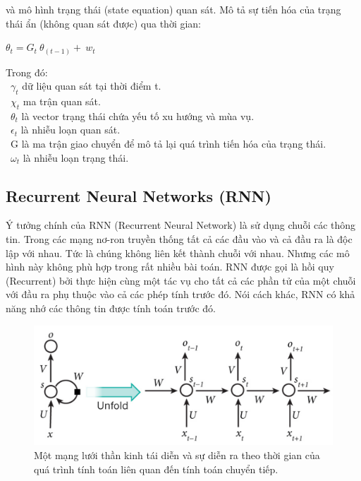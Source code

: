 \documentclass[conference]{IEEEtran}
\begin{document}
và mô hình trạng thái (state equation) quan sát. Mô tả sự tiến hóa của trạng thái ẩn (không quan sát được) qua thời gian:

\begin{center}

    \(\theta_t=G_t\ \theta_(t-1)+\ w_t\)

\end{center}

Trong đó:\\
\indent\textbullet\ \(\gamma_t\) dữ liệu quan sát tại thời điểm t.\\
\indent\textbullet\ \(\chi_t\) ma trận quan sát.\\
\indent\textbullet\ \(\theta_t\) là vector trạng thái chứa yếu tố xu hướng và mùa vụ.\\
\indent\textbullet\ \(\epsilon_t\) là nhiễu loạn quan sát.\\
\indent\textbullet\ G là ma trận giao chuyển để mô tả lại quá trình tiến hóa của trạng thái.\\
\indent\textbullet\ \(\omega_t\) là nhiễu loạn trạng thái.

\subsection{Recurrent Neural Networks (RNN)}
Ý tưởng chính của RNN (Recurrent Neural Network) là sử dụng chuỗi các thông tin. Trong các mạng nơ-ron truyền thống tất cả các đầu vào và cả đầu ra là độc lập với nhau. Tức là chúng không liên kết thành chuỗi với nhau. Nhưng các mô hình này không phù hợp trong rất nhiều bài toán. RNN được gọi là hồi quy (Recurrent) bởi thực hiện cùng một tác vụ cho tất cả các phần tử của một chuỗi với đầu ra phụ thuộc vào cả các phép tính trước đó. Nói cách khác, RNN có khả năng nhớ các thông tin được tính toán trước đó.

\begin{figure}[H]
    \centering
    \begin{minipage}{0.23\textwidth}
        \centering
        \includegraphics[width=1\textwidth]{bibliography/figure/RNN/RNN.pdf}
        \caption{Một mạng lưới thần kinh tái diễn và sự diễn ra theo thời gian của quá trình tính toán liên quan đến tính toán chuyển tiếp.}
        \label{fig:RNN}
    \end{minipage}

\end{figure}
\end{document}
